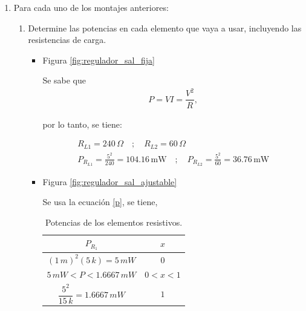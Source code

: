 \begin{enumerate}
        \item Para cada uno de los montajes anteriores:
            \begin{enumerate}
                \item Determine las potencias en cada elemento que vaya a usar, incluyendo las resistencias de carga.

                    \begin{itemize}
                        \item Figura \ref{fig:regulador_sal_fija}

                        
                            Se sabe que 
                            \begin{gather}
                                P=VI=\dfrac{V^2}{R} \label{p},
                            \end{gather}
                            
                             por lo tanto, se tiene:

                           \begin{gather*}
                                R_{L1} = 240 \, \Omega \quad ; \quad R_{L2} = 60 \, \Omega \\
                                P_{R_{L1}} = \frac{5^2}{240} = 104.16 \, \mathrm{mW} \quad ; \quad P_{R_{L2}} = \frac{5^2}{60} = 36.76 \, \mathrm{mW}
                            \end{gather*}

                        \item Figura \ref{fig:regulador_sal_ajustable}

                            Se usa la ecuación \ref{p}, se tiene,

                            \begin{table}[H]
                                \centering
                                \begin{tabular}{|c|c|}
                                    \hline
                                    \textbf{$P_{R_1}$}                   & \textbf{$x$} \\ \hline
                                    $(1 \, m)^2(5 \, k)=5 \, mW$         & $0$          \\ \hline
                                    $5 \, mW < P < 1.6667 \, mW$         & $0<x<1$      \\ \hline
                                    $\dfrac{5^2}{15 \, k}= 1.6667 \, mW$ & $1$          \\ \hline
                                \end{tabular}
                                \caption{Potencias de los elementos resistivos.}
                            \end{table}


\end{itemize}
\end{enumerate}
\end{enumerate}
